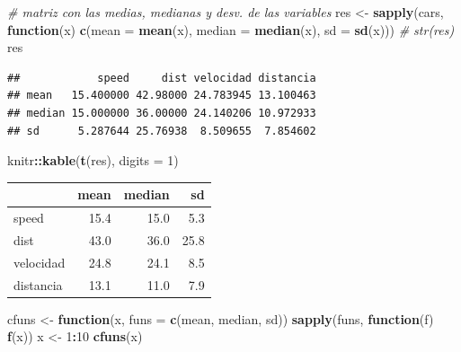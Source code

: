 \documentclass[]{book}
\newenvironment{Shaded}{\begin{snugshade}}{\end{snugshade}}
\newcommand{\CommentTok}[1]{\textcolor[rgb]{0.56,0.35,0.01}{\textit{#1}}}
\newcommand{\ControlFlowTok}[1]{\textcolor[rgb]{0.13,0.29,0.53}{\textbf{#1}}}
\newcommand{\DataTypeTok}[1]{\textcolor[rgb]{0.13,0.29,0.53}{#1}}
\newcommand{\DecValTok}[1]{\textcolor[rgb]{0.00,0.00,0.81}{#1}}
\newcommand{\KeywordTok}[1]{\textcolor[rgb]{0.13,0.29,0.53}{\textbf{#1}}}
\newcommand{\NormalTok}[1]{#1}
\newcommand{\OperatorTok}[1]{\textcolor[rgb]{0.81,0.36,0.00}{\textbf{#1}}}
\newcommand{\StringTok}[1]{\textcolor[rgb]{0.31,0.60,0.02}{#1}}
\begin{document}
\begin{Shaded}
\begin{Highlighting}[]
\CommentTok{# matriz con las medias, medianas y desv. de las variables}
\NormalTok{res <-}\StringTok{ }\KeywordTok{sapply}\NormalTok{(cars, }
          \ControlFlowTok{function}\NormalTok{(x) }\KeywordTok{c}\NormalTok{(}\DataTypeTok{mean =} \KeywordTok{mean}\NormalTok{(x), }\DataTypeTok{median =} \KeywordTok{median}\NormalTok{(x), }\DataTypeTok{sd =} \KeywordTok{sd}\NormalTok{(x)))}
\CommentTok{# str(res)}
\NormalTok{res}
\end{Highlighting}
\end{Shaded}

\begin{verbatim}
##            speed     dist velocidad distancia
## mean   15.400000 42.98000 24.783945 13.100463
## median 15.000000 36.00000 24.140206 10.972933
## sd      5.287644 25.76938  8.509655  7.854602
\end{verbatim}

\begin{Shaded}
\begin{Highlighting}[]
\NormalTok{knitr}\OperatorTok{::}\KeywordTok{kable}\NormalTok{(}\KeywordTok{t}\NormalTok{(res), }\DataTypeTok{digits =} \DecValTok{1}\NormalTok{)}
\end{Highlighting}
\end{Shaded}

\begin{tabular}{l|r|r|r}
\hline
  & mean & median & sd\\
\hline
speed & 15.4 & 15.0 & 5.3\\
\hline
dist & 43.0 & 36.0 & 25.8\\
\hline
velocidad & 24.8 & 24.1 & 8.5\\
\hline
distancia & 13.1 & 11.0 & 7.9\\
\hline
\end{tabular}

\begin{Shaded}
\begin{Highlighting}[]
\NormalTok{cfuns <-}\StringTok{ }\ControlFlowTok{function}\NormalTok{(x, }\DataTypeTok{funs =} \KeywordTok{c}\NormalTok{(mean, median, sd))}
            \KeywordTok{sapply}\NormalTok{(funs, }\ControlFlowTok{function}\NormalTok{(f) }\KeywordTok{f}\NormalTok{(x))}
\NormalTok{x <-}\StringTok{ }\DecValTok{1}\OperatorTok{:}\DecValTok{10}
\KeywordTok{cfuns}\NormalTok{(x)}
\end{Highlighting}
\end{Shaded}
\end{document}
